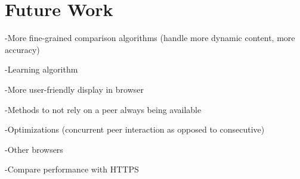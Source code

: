 \section{Future Work}
\label{sec:future}

-More fine-grained comparison algorithms (handle more dynamic content, more accuracy)

-Learning algorithm

-More user-friendly display in browser

-Methods to not rely on a peer always being available

-Optimizations (concurrent peer interaction as opposed to consecutive)

-Other browsers

-Compare performance with HTTPS

